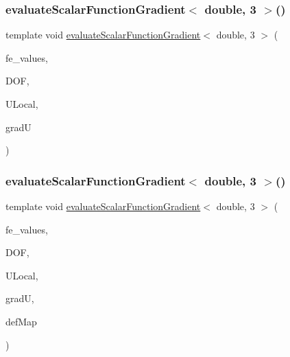 \mbox{\label{function_evaluations_8cc_a9c4d97c0a964edc8d705a9086abc7a87}} 
\subsubsection{\texorpdfstring{evaluate\+Scalar\+Function\+Gradient$<$ double, 3 $>$()}{evaluateScalarFunctionGradient< double, 3 >()}\hspace{0.1cm}{\footnotesize\ttfamily [1/4]}}
{\footnotesize\ttfamily template void \mbox{\hyperlink{group___evaluation_functions_gabedd4ae2841d2332ed0df0513b189e34}{evaluate\+Scalar\+Function\+Gradient}}$<$ double, 3 $>$ (\begin{DoxyParamCaption}\item[{const F\+E\+Values$<$ 3 $>$ \&}]{fe\+\_\+values,  }\item[{unsigned int}]{D\+OF,  }\item[{Table$<$ 1, double $>$ \&}]{U\+Local,  }\item[{Table$<$ 2, double $>$ \&}]{gradU }\end{DoxyParamCaption})}

\mbox{\label{function_evaluations_8cc_a57903628597a149ecf0c07eb33c3cc94}} 
\subsubsection{\texorpdfstring{evaluate\+Scalar\+Function\+Gradient$<$ double, 3 $>$()}{evaluateScalarFunctionGradient< double, 3 >()}\hspace{0.1cm}{\footnotesize\ttfamily [2/4]}}
{\footnotesize\ttfamily template void \mbox{\hyperlink{group___evaluation_functions_gabedd4ae2841d2332ed0df0513b189e34}{evaluate\+Scalar\+Function\+Gradient}}$<$ double, 3 $>$ (\begin{DoxyParamCaption}\item[{const F\+E\+Values$<$ 3 $>$ \&}]{fe\+\_\+values,  }\item[{unsigned int}]{D\+OF,  }\item[{Table$<$ 1, double $>$ \&}]{U\+Local,  }\item[{Table$<$ 2, double $>$ \&}]{gradU,  }\item[{\mbox{\hyperlink{structdeformation_map}{deformation\+Map}}$<$ double, 3 $>$ \&}]{def\+Map }\end{DoxyParamCaption})}

